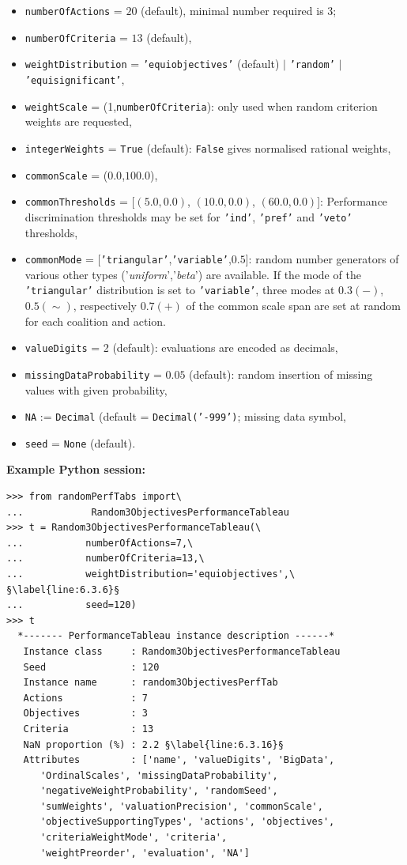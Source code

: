 \begin{itemize}[leftmargin=0.5cm,rightmargin=0.5cm]
\item \texttt{numberOfActions} = $20$ (default), minimal number required is 3; 
\item \texttt{numberOfCriteria} = $13$ (default),
\item \texttt{weightDistribution} = \texttt{'equiobjectives'} (default) $|$ \texttt{'random'} $|$ \texttt{'equisignificant'},
\item \texttt{weightScale} = (1,\texttt{numberOfCriteria}): only used when random criterion weights are requested,
\item \texttt{integerWeights} = \texttt{True} (default): \texttt{False} gives normalised rational weights, 
\item \texttt{commonScale} = ($0.0$,$100.0$),
\item \texttt{commonThresholds} = [$(5.0,0.0)$, $(10.0,0.0)$, $(60.0,0.0)$]: Performance discrimination thresholds may be set for \texttt{'ind'}, \texttt{'pref'} and \texttt{'veto'} thresholds,  
\item \texttt{commonMode} = [\texttt{'triangular'},\texttt{'variable'},$0.5$]: random number generators of various other types ('\emph{uniform}','\emph{beta}') are available. If the mode of the \texttt{'triangular'} distribution is set to \texttt{'variable'}, three modes at $0.3 (-)$, $0.5 (\sim)$, respectively $0.7 (+)$ of the common scale span are set at random for each coalition and action. 
\item \texttt{valueDigits} = 2 (default): evaluations are encoded as decimals,
\item \texttt{missingDataProbability} = $0.05$ (default): random insertion of missing values with given probability,  
\item \texttt{NA} := \texttt{Decimal} (default = \texttt{Decimal('-999')}; missing data symbol,
\item \texttt{seed} = \texttt{None} (default). 
\end{itemize}

\noindent \textbf{Example Python session:}
\begin{lstlisting}[caption={Generating a random 3 Objectives performance tableau},label=list:6.3]
>>> from randomPerfTabs import\
...            Random3ObjectivesPerformanceTableau
>>> t = Random3ObjectivesPerformanceTableau(\
...           numberOfActions=7,\
...           numberOfCriteria=13,\
...           weightDistribution='equiobjectives',\ §\label{line:6.3.6}§
...           seed=120)
>>> t
  *------- PerformanceTableau instance description ------*
   Instance class     : Random3ObjectivesPerformanceTableau
   Seed               : 120
   Instance name      : random3ObjectivesPerfTab
   Actions            : 7
   Objectives         : 3
   Criteria           : 13
   NaN proportion (%) : 2.2 §\label{line:6.3.16}§
   Attributes         : ['name', 'valueDigits', 'BigData',
      'OrdinalScales', 'missingDataProbability',
      'negativeWeightProbability', 'randomSeed',
      'sumWeights', 'valuationPrecision', 'commonScale',
      'objectiveSupportingTypes', 'actions', 'objectives',
      'criteriaWeightMode', 'criteria',
      'weightPreorder', 'evaluation', 'NA']
\end{lstlisting}

